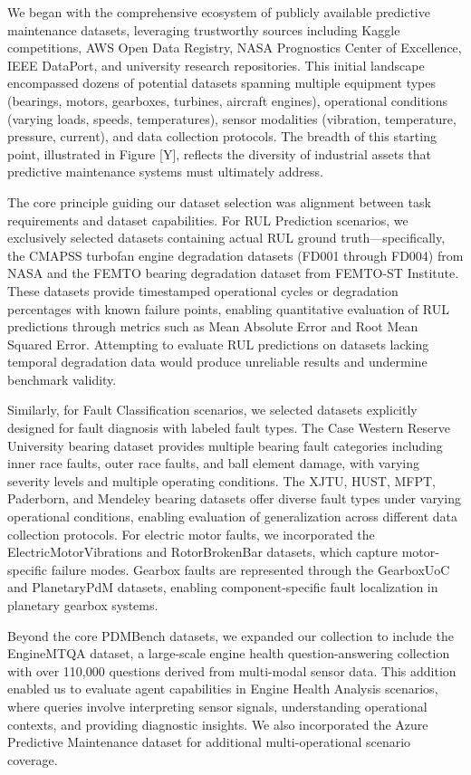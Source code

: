 \documentclass[conference]{IEEEtran}
\begin{document}
We began with the comprehensive ecosystem of publicly available predictive maintenance datasets, leveraging trustworthy sources including Kaggle competitions, AWS Open Data Registry, NASA Prognostics Center of Excellence, IEEE DataPort, and university research repositories. This initial landscape encompassed dozens of potential datasets spanning multiple equipment types (bearings, motors, gearboxes, turbines, aircraft engines), operational conditions (varying loads, speeds, temperatures), sensor modalities (vibration, temperature, pressure, current), and data collection protocols. The breadth of this starting point, illustrated in Figure [Y], reflects the diversity of industrial assets that predictive maintenance systems must ultimately address.

The core principle guiding our dataset selection was alignment between task requirements and dataset capabilities. For RUL Prediction scenarios, we exclusively selected datasets containing actual RUL ground truth—specifically, the CMAPSS turbofan engine degradation datasets (FD001 through FD004) from NASA and the FEMTO bearing degradation dataset from FEMTO-ST Institute. These datasets provide timestamped operational cycles or degradation percentages with known failure points, enabling quantitative evaluation of RUL predictions through metrics such as Mean Absolute Error and Root Mean Squared Error. Attempting to evaluate RUL predictions on datasets lacking temporal degradation data would produce unreliable results and undermine benchmark validity.

Similarly, for Fault Classification scenarios, we selected datasets explicitly designed for fault diagnosis with labeled fault types. The Case Western Reserve University bearing dataset provides multiple bearing fault categories including inner race faults, outer race faults, and ball element damage, with varying severity levels and multiple operating conditions. The XJTU, HUST, MFPT, Paderborn, and Mendeley bearing datasets offer diverse fault types under varying operational conditions, enabling evaluation of generalization across different data collection protocols. For electric motor faults, we incorporated the ElectricMotorVibrations and RotorBrokenBar datasets, which capture motor-specific failure modes. Gearbox faults are represented through the GearboxUoC and PlanetaryPdM datasets, enabling component-specific fault localization in planetary gearbox systems.

Beyond the core PDMBench datasets, we expanded our collection to include the EngineMTQA dataset, a large-scale engine health question-answering collection with over 110,000 questions derived from multi-modal sensor data. This addition enabled us to evaluate agent capabilities in Engine Health Analysis scenarios, where queries involve interpreting sensor signals, understanding operational contexts, and providing diagnostic insights. We also incorporated the Azure Predictive Maintenance dataset for additional multi-operational scenario coverage.
\end{document}
